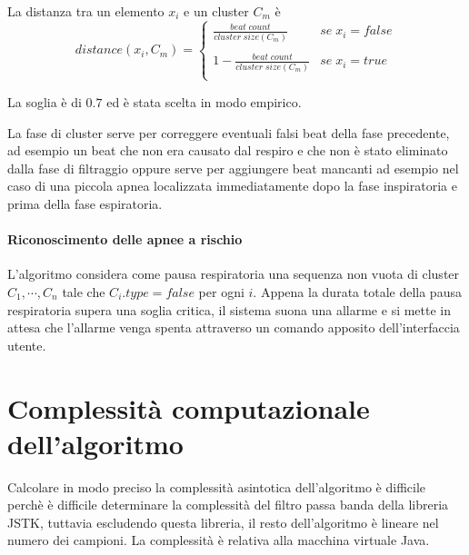 La distanza tra un elemento $x_{i}$ e un cluster $C_{m}$ \`e 
\[
distance(x_{i}, C_{m})= 
 \left\{ 
    \begin{array}{ll}
 	\displaystyle\frac{beat\; count}{cluster\; size(C_{m})}
       &
 	se\; x_{i}=false
     \\\\
 	1-\displaystyle\frac{beat\; count}{cluster\; size(C_{m})}
       &
 	se\; x_{i}=true
     \\
     \end{array}
   \right.
\]

La soglia \`e di $0.7$ ed \`e stata scelta in modo empirico.






La fase di cluster serve per correggere eventuali falsi beat della fase precedente, ad esempio un beat che non era causato dal respiro e che non \`e stato eliminato dalla fase di filtraggio oppure serve per aggiungere beat mancanti ad esempio nel caso di una piccola apnea localizzata immediatamente dopo la fase inspiratoria e prima della fase espiratoria.


\paragraph{Riconoscimento delle apnee a rischio}

L'algoritmo considera come pausa respiratoria una sequenza non vuota di cluster $C_{1}, \cdots, C_{n}$ tale che $C_{i}.type=false$ per ogni $i$.
Appena la durata totale della pausa respiratoria supera una soglia critica, il sistema suona una allarme e si mette in attesa che l'allarme venga spenta attraverso un comando apposito dell'interfaccia utente.





\section{Complessit\`a computazionale dell'algoritmo}

Calcolare in modo preciso la complessit\`a asintotica dell'algoritmo \`e difficile perch\`e \`e difficile determinare la complessit\`a del filtro passa banda della libreria JSTK, tuttavia escludendo questa libreria, il resto dell'algoritmo \`e lineare nel numero dei campioni. 
La complessit\`a \`e relativa alla macchina virtuale Java. 










